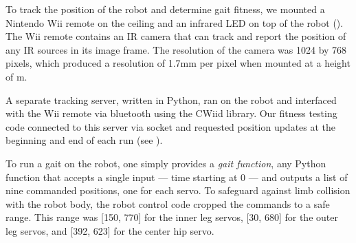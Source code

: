 To track the position of the robot and determine gait fitness, we
mounted a Nintendo Wii remote on the ceiling and an infrared LED on
top of the robot ().  The Wii remote contains an
IR camera that can track and report the position of any IR sources in
its image frame.  The resolution of the camera was 1024 by 768 pixels,
which produced a resolution of 1.7mm per pixel when mounted at a
height of m.

A separate tracking server, written in Python, ran on the robot and
interfaced with the Wii remote via bluetooth using the CWiid
library\cite{cwiid}.  Our fitness testing code connected to this
server via socket and requested position updates at the beginning and
end of each run (see ).


To run a gait on the robot, one simply provides a \emph{gait
  function}, any Python function that accepts a single input --- time
starting at 0 --- and outputs a list of nine commanded positions, one
for each servo.  To safeguard against limb collision with the robot
body, the robot control code cropped the commands to a safe range.
This range was [150, 770] for the inner leg servos, [30, 680] for the
outer leg servos, and [392, 623] for the center hip servo.





